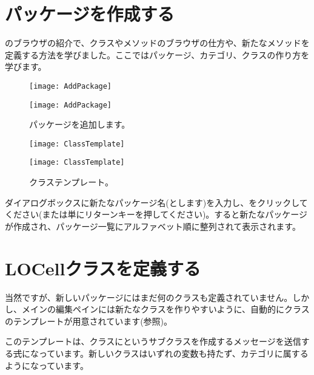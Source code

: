 \documentclass[a4paper,10pt,twoside]{book}
\begin{document}
\section{パッケージを作成する}

のブラウザの紹介で、クラスやメソッドのブラウザの仕方や、新たなメソッドを定義する方法を学びました。ここではパッケージ、カテゴリ、クラスの作り方を学びます。


\begin{figure}[htb]
\begin{minipage}[b]{0.48\textwidth}
\ifluluelse
	{\centerline {\texttt{[image: AddPackage]}}}
	{\centerline {\texttt{[image: AddPackage]}}}
	\caption{パッケージを追加します。
	}
\end{minipage}
\hfill
\begin{minipage}[b]{0.48\textwidth}
\ifluluelse
	{\centerline {\texttt{[image: ClassTemplate]}}}
	{\centerline {\texttt{[image: ClassTemplate]}}}
	\caption{クラステンプレート。
	}
\end{minipage}
\end{figure}

ダイアログボックスに新たなパッケージ名(とします)を入力し、をクリックしてください(または単にリターンキーを押してください)。すると新たなパッケージが作成され、パッケージ一覧にアルファベット順に整列されて表示されます。

\section{LOCellクラスを定義する}

当然ですが、新しいパッケージにはまだ何のクラスも定義されていません。しかし、メインの編集ペインには新たなクラスを作りやすいように、自動的にクラスのテンプレートが用意されています(参照)。

このテンプレートは、クラスにというサブクラスを作成するメッセージを送信する\st 式になっています。新しいクラスはいずれの変数も持たず、カテゴリに属するようになっています。
\end{document}
